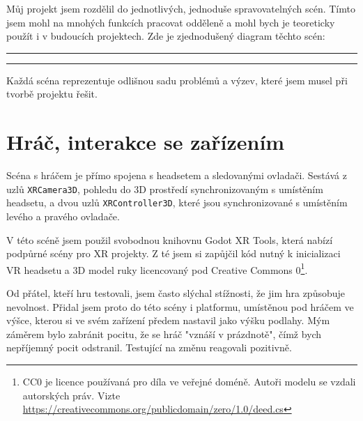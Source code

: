 \begin{samepage}
  Můj projekt jsem rozdělil do jednotlivých, jednoduše spravovatelných scén. Tímto jsem mohl na mnohých funkcích pracovat odděleně a mohl bych je teoreticky použít i v budoucích projektech. Zde je zjednodušený diagram těchto scén:

  \vspace{1em}
  \hrule
  \vspace{1em}

  \renewcommand\DTstyle{\sffamily}
  \vspace{1em}
  \hrule
  \vspace{1em}

  Každá scéna reprezentuje odlišnou sadu problémů a výzev, které jsem musel při tvorbě projektu řešit.
\end{samepage}

\section{Hráč, interakce se zařízením}

Scéna s hráčem je přímo spojena s headsetem a sledovanými ovladači. Sestává z uzlů \texttt{XRCamera3D}, pohledu do 3D prostředí synchronizovaným s umístěním headsetu, a dvou uzlů \texttt{XRController3D}, které jsou synchronizované s umístěním levého a pravého ovladače.

V této scéně jsem použil svobodnou knihovnu Godot XR Tools, která nabízí podpůrné scény pro XR projekty. Z té jsem si zapůjčil kód nutný k inicializaci VR headsetu a 3D model ruky licencovaný pod Creative Commons 0\footnote{CC0 je licence používaná pro díla ve veřejné doméně. Autoři modelu se vzdali autorských práv. Vizte \url{https://creativecommons.org/publicdomain/zero/1.0/deed.cs}}.

Od přátel, kteří hru testovali, jsem často slýchal stížnosti, že jim hra způsobuje nevolnost. Přidal jsem proto do této scény i platformu, umístěnou pod hráčem ve výšce, kterou si ve svém zařízení předem nastavil jako výšku podlahy. Mým záměrem bylo zabránit pocitu, že se hráč "vznáší v prázdnotě", čímž bych nepříjemný pocit odstranil. Testující na změnu reagovali pozitivně. 


